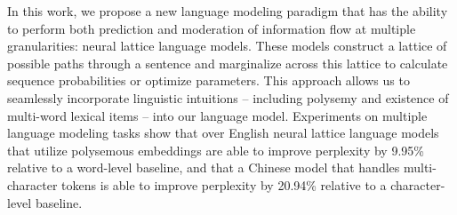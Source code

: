 In this work, we propose a new language modeling paradigm that has the ability to perform both prediction and moderation of information flow at multiple granularities: neural lattice language models. These models construct a lattice of possible paths through a sentence and marginalize across this lattice to calculate sequence probabilities or optimize parameters. This approach allows us to seamlessly incorporate linguistic intuitions -- including polysemy and existence of multi-word lexical items -- into our language model. Experiments on multiple language modeling tasks show that over English neural lattice language models that utilize polysemous embeddings are able to improve perplexity by 9.95\% relative to a word-level baseline, and that a Chinese model that handles multi-character tokens is able to improve perplexity by 20.94\% relative to a character-level baseline.
